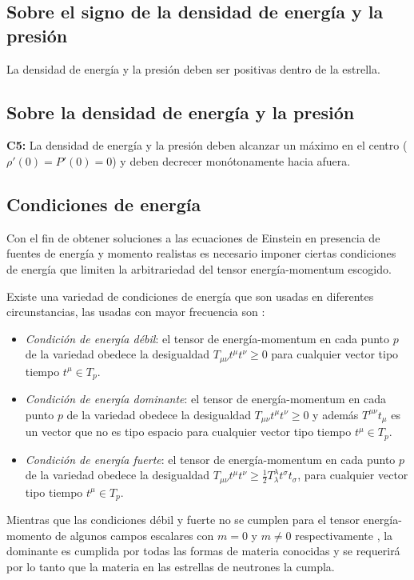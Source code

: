 \subsection*{Sobre el signo de la densidad de energía y la presión}
La densidad de energía y la presión deben ser positivas dentro de la estrella.

\subsection*{Sobre la densidad de energía y la presión}
\textbf{C5:} La densidad de energía y la presión deben alcanzar un máximo en el centro ($\rho'(0)=P'(0)=0$) y deben decrecer monótonamente hacia afuera.

\subsection*{Condiciones de energía}
Con el fin de obtener soluciones a las ecuaciones de Einstein en presencia de fuentes de energía y momento realistas es necesario imponer ciertas condiciones de energía que limiten la arbitrariedad del tensor energía-momentum escogido.

Existe una variedad de condiciones de energía que son usadas en diferentes circunstancias, las usadas con mayor frecuencia son \cite{Hawking1973TheSpaceTime,Carroll2003SpacetimeRelativity}:

\begin{itemize}[leftmargin=1.5cm]
    \item \emph{Condición de energía débil}: el tensor de energía-momentum en cada punto $p$ de la variedad obedece la desigualdad $T_{\mu \nu} t^{\mu} t^{\nu} \geq 0$ para cualquier vector tipo tiempo $t^{\mu}\in T_{p}$.
    \item \emph{Condición de energía dominante}: el tensor de energía-momentum en cada punto $p$ de la variedad obedece la desigualdad $T_{\mu \nu} t^{\mu} t^{\nu} \geq 0$ y además $T^{\mu \nu} t_{\mu}$ es un vector que no es tipo espacio para cualquier vector tipo tiempo $t^{\mu}\in T_{p}$.
    \item \emph{Condición de energía fuerte}: el tensor de energía-momentum en cada punto $p$ de la variedad obedece la desigualdad $T_{\mu \nu} t^{\mu} t^{\nu} \geq \frac{1}{2} T_{\lambda}^{\lambda} t^{\sigma} t_{\sigma}$, para cualquier vector tipo tiempo $t^{\mu}\in T_{p}$.
\end{itemize}
Mientras que las condiciones débil y fuerte no se cumplen para el tensor energía-momento de algunos campos escalares con $m=0$ y $m\neq 0$ respectivamente \cite{Hawking1973TheSpaceTime}, la dominante es cumplida por todas las formas de materia conocidas y se requerirá por lo tanto que la materia en las estrellas de neutrones la cumpla. 

